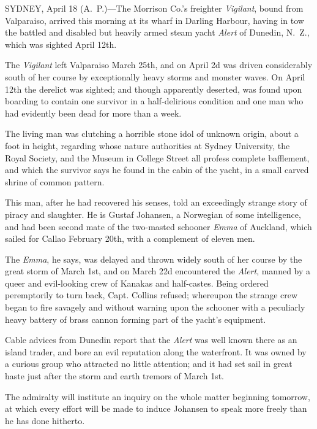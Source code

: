 \documentclass{newspaper1920}
\begin{document}
\fancyrule
\vspace{-\baselineskip}
\vspace{-\baselineskip}
\begin{multicols}{3}
SYDNEY, April 18 (A.~P.)---The Morrison Co.'s freighter
\emph{Vigilant}, bound from Valparaiso, arrived this morning at its
wharf in Darling Harbour, having in tow the battled and disabled but
heavily armed steam yacht \emph{Alert} of Dunedin, N.~Z., which was
sighted April 12th.

The \emph{Vigilant} left Valparaiso March 25th, and on April 2d was
driven considerably south of her course by exceptionally heavy storms
and monster waves.  On April 12th the derelict was sighted; and though
apparently deserted, was found upon boarding to contain one survivor
in a half-delirious condition and one man who had evidently been dead
for more than a week.

The living man was clutching a horrible stone idol of unknown origin,
about a foot in height, regarding whose nature authorities at Sydney
University, the Royal Society, and the Museum in College Street all
profess complete bafflement, and which the survivor says he found in
the cabin of the yacht, in a small carved shrine of common pattern.

This man, after he had recovered his senses, told an exceedingly
strange story of piracy and slaughter.  He is Gustaf Johansen, a
Norwegian of some intelligence, and had been second mate of the
two-masted schooner \emph{Emma} of Auckland, which sailed for Callao
February 20th, with a complement of eleven men.

The \emph{Emma}, he says, was delayed and thrown widely south of her
course by the great storm of March 1st, and on March 22d encountered
the \emph{Alert}, manned by a queer and evil-looking crew of Kanakas
and half-castes.  Being ordered peremptorily to turn back,
Capt. Collins refused; whereupon the strange crew began to fire
savagely and without warning upon the schooner with a peculiarly
heavy battery of brass cannon forming part of the yacht's equipment.

Cable advices from Dunedin report that the \emph{Alert} was well known
there as an island trader, and bore an evil reputation along the
waterfront.  It was owned by a curious group who attracted no little
attention; and it had set sail in great haste just after the storm and
earth tremors of March 1st.


The admiralty will institute an inquiry on the whole matter beginning
tomorrow, at which every effort will be made to induce Johansen to
speak more freely than he has done hitherto.

\vfill
{}

\end{multicols}
\end{document}
